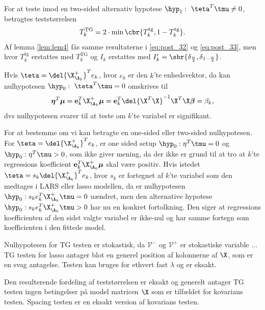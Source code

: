 For at teste imod en two-sided alternativ hypotese \(\hyp_1: \ \teta^T \tmu \neq 0\), betragtes teststørrelsen
\begin{align*}
T_k^\text{TG}= 2 \cdot \min \cbr{T_k^{\text{tg}}, 1-T_k^{\text{tg}}}.
\end{align*}
Af lemma \ref{lem:lem4} fås samme resultaterne i \eqref{eq:post_32} og \eqref{eq:post_33}, men hvor \(T_k^\text{tg}\) erstattes med \(T_k^\text{TG}\) og \(I_k\) erstattes med \(I_k'= \sbr{\delta_{\frac{\alpha}{2}}, \delta_{1-\frac{\alpha}{2}}}\).

Hvis \(\teta = \del{\X_{\A_k}^+}^T e_k\), hvor \(e_k\) er den \(k\)'te enhedsvektor, da kan nulhypotesen \(\hyp_0: \ \teta^T \tmu =0\) omskrives til
\begin{align*}
\boldsymbol{\eta}^T \boldsymbol{\mu} = \mathbf{e}_k^T \X_{\A_k}^+ \boldsymbol{\mu} = \mathbf{e}_k^T \del{\X^T \X}^{-1} \X^T \X \boldsymbol{\beta} = \beta_k,
\end{align*}
dvs nulhypotesen svarer til at teste om \(k\)'te variabel er signifikant.

For at bestemme om vi kan betragte en one-sided eller two-sided nulhypotesen.
For \(\teta = \del{\X_{\A_k}^+}^T e_k\), er one sided setup \(\hyp_0: \eta^T \tmu = 0\) og  \(\hyp_0: \eta^T \tmu > 0\), som ikke giver mening, da der ikke er grund til at tro at \(k\)'te regressions koefficient \(\mathbf{e}_k^T \X_{\A_k}^+ \boldsymbol{\mu}\) skal være positiv.
Hvis istedet \(\teta = s_k \del{\X_{\A_k}^+}^T e_k\), hvor \(s_k\) er fortegnet af \(k\)'te variabel som den medtages i LARS eller lasso modellen, da er nulhypotesen \(\hyp_0: s_k e_k^T \X_{\A_k}^+ \tmu = 0\) uændret, men den alternative hypotese \(\hyp_0: s_k e_k^T \X_{\A_k}^+ \tmu > 0\) har nu en konkret fortolkning.
Den siger at regressions koefficienten af den sidst valgte variabel er ikke-nul og har samme fortegn som koefficienten i den fittede model.


Nulhypotesen for TG testen er stokastisk, da \(\mathcal{V}^-\) og \(\mathcal{V}^+\) er stokastiske variable ...
TG testen for lasso antager blot en generel position af kolonnerne af \(\X\), som er en svag antagelse.
Testen kan bruges for ethvert fast \(\lambda\) og er eksakt.

Den resulterende fordeling af teststørrelsen er eksakt og generelt antager TG testen ingen betingelser på model matricen \(\X\) som er tilfældet for kovarians testen.
Spacing testen er en eksakt version af kovarians testen. 
\newpage

